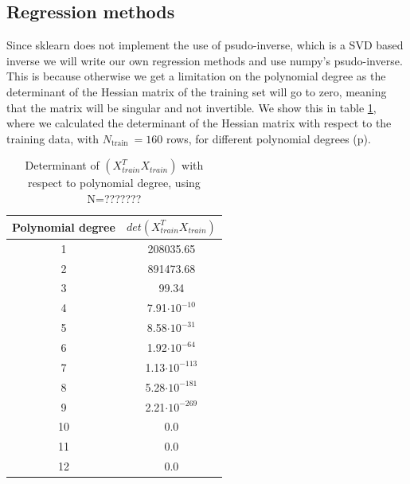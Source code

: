 \subsection{Regression methods} \label{sec:regression_methods}
Since sklearn does not implement the use of psudo-inverse, which is a SVD based
inverse we will write our own regression methods and use numpy's psudo-inverse.
This is because otherwise we get a limitation on the polynomial degree as the
determinant of the Hessian matrix of the training set will go to zero, meaning
that the matrix will be singular and not invertible. We show this in table
\ref{tab:determinants}, where we calculated the determinant of the Hessian matrix with respect to the
training data, with $N_{\text{train }} = 160 $ rows, for different polynomial
degrees (p). 

\begin{table}
    \centering
    \caption{Determinant of $(X^T_{train}X_{train})$ with respect to polynomial
    degree, using N=???????}
    \begin{tabular}{|c|c|}
        \hline
        Polynomial degree & $det(X_{train}^T X_{train})$  \\
        \hline
        1 & 208035.65\\
        \hline
        2 & 891473.68\\
        \hline
        3 & 99.34\\
        \hline
        4 & 7.91$\cdot10^{-10}$ \\
        \hline
        5 & 8.58$\cdot10^{-31}$ \\
        \hline
        6 & 1.92$\cdot10^{-64}$ \\
        \hline
        7 & 1.13$\cdot10^{-113}$ \\
        \hline
        8 & 5.28$\cdot10^{-181}$ \\
        \hline
        9 & 2.21$\cdot10^{-269}$ \\
        \hline
        10 & 0.0 \\
        \hline
        11 & 0.0 \\
        \hline
        12 & 0.0 \\
        \hline
    \end{tabular}\label{tab:determinants}
\end{table}


